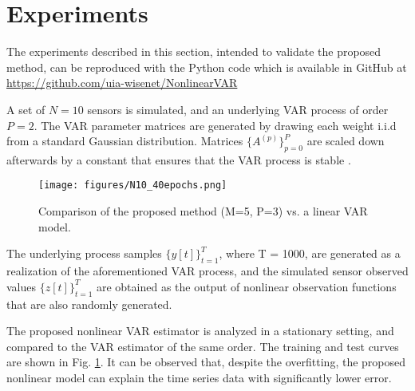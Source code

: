 \section{Experiments}

The experiments described in this section, intended to validate the proposed method, can be reproduced with the Python code which is available in GitHub at \url{https://github.com/uia-wisenet/NonlinearVAR}

A set of $N=10$ sensors is simulated, and an underlying VAR process of order $P = 2$. The VAR parameter matrices are generated by drawing each weight i.i.d from a standard Gaussian distribution. Matrices $\{A^{(p)}\}_{p=0}^P$ are  scaled down afterwards by a constant that ensures that the VAR process is stable \cite{lutkepohl2005}. 


\begin{figure}[h]
\vspace{-0.5cm}
\centering
\texttt{[image: figures/N10\_40epochs.png]}
\caption{Comparison of the proposed method (M=5, P=3) vs. a linear VAR model.%
}
\label{fig:nl_vs_linear4}
\end{figure}


The underlying process samples $\{y[t]\}_{t=1}^T$, where T = 1000, are generated as a realization of the aforementioned VAR process, and the simulated sensor observed values $\{z[t]\}_{t=1}^T$ are obtained as the output of nonlinear observation functions that are also randomly generated. %




The proposed nonlinear VAR estimator is analyzed in a stationary setting, and compared to the VAR estimator of the same order. The training and test curves are shown in Fig. \ref{fig:nl_vs_linear4}. It can be observed that, despite the overfitting, the proposed nonlinear model can explain the time series data with significantly lower error.



